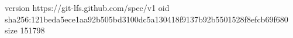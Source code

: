 version https://git-lfs.github.com/spec/v1
oid sha256:121beda5ece1aa92b505bd3100dc5a130418f9137b92b5501528f8efcb69f680
size 151798
